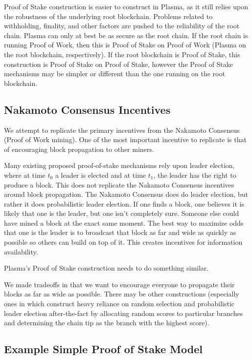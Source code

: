 \documentclass[letterpaper, 11pt]{article}
\begin{document}
Proof of Stake construction is easier to construct in Plasma, as it still relies
upon the robustness of the underlying root blockchain. Problems related to
withholding, finality, and other factors are pushed to the reliability of the
root chain. Plasma can only at best be as secure as the root chain. If the root
chain is running Proof of Work, then this is Proof of Stake on Proof of Work
(Plasma on the root blockchain, respectively). If the root blockchain is Proof
of Stake, this construction is Proof of Stake on Proof of Stake, however the
Proof of Stake mechanisms may be simpler or different than the one running on
the root blockchain.

\subsection{Nakamoto Consensus Incentives}

We attempt to replicate the primary incentives from the Nakamoto Consensus
(Proof of Work mining). One of the most important incentive to replicate is that
of encouraging block propagation to other miners.

Many existing proposed proof-of-stake mechanisms rely upon leader election,
where at time $t_{0}$ a leader is elected and at time $t_{1}$, the leader has
the right to produce a block. This does not replicate the Nakamoto Consensus
incentives around block propagation. The Nakamoto Consensus does do leader
election, but rather it does probabilistic leader election. If one finds a
block, one believes it is likely that one is the leader, but one isn't
completely sure. Someone else could have mined a block at the exact same moment.
The best way to maximize odds that one is the leader is to broadcast that block
as far and wide as quickly as possible so others can build on top of it. This
creates incentives for information availability.

Plasma's Proof of Stake construction needs to do something similar.

We made tradeoffs in that we want to encourage everyone to propagate their
blocks as far as wide as possible. There may be other constructions (especially
ones in which construct heavy reliance on random selection and probabilistic
leader election after-the-fact by allocating random scores to particular
branches and determining the chain tip as the branch with the highest score).

\subsection{Example Simple Proof of Stake Model}
\end{document}
